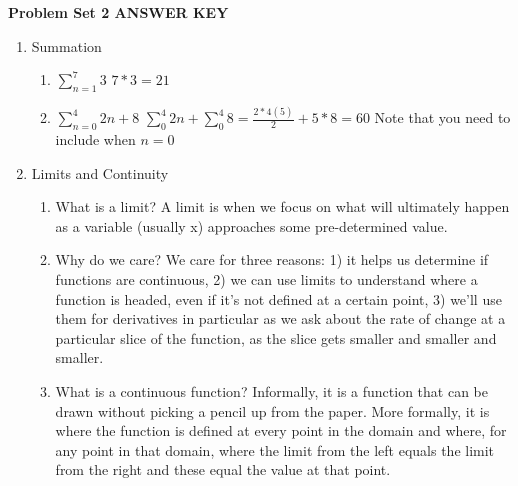 \documentclass[11pt]{article}
\begin{document}
\noindent \textbf{Problem Set 2 \color{gray} ANSWER KEY} \color{black}

\begin{enumerate}
\item Summation
\begin{enumerate}
\item $\sum_{n=1}^{7}3$ \color{gray} $7*3=21$\color{black}
\item $\sum_{n=0}^{4} 2n+8$ \color{gray} $\sum_0^4 2n+ \sum_0^4 8= \frac{2*4(5)}{2}+5*8=60$ Note that you need to include when $n=0$  \color{black}
\end{enumerate}

\item Limits and Continuity
\begin{enumerate}
\item What is a limit? \color{gray} A limit is when we focus on what will ultimately happen as a variable (usually x) approaches some pre-determined value. \color{black}
\item Why do we care? \color{gray} We care for three reasons: 1) it helps us determine if functions are continuous, 2) we can use limits to understand where a function is headed, even if it's not defined at a certain point, 3) we'll use them for derivatives in particular as we ask about the rate of change at a particular slice of the function, as the slice gets smaller and \small smaller and \tiny smaller. \normalsize \color{black}
\item What is a continuous function? \color{gray} Informally, it is a function that can be drawn without picking a pencil up from the paper. More formally, it is where the function is defined at every point in the domain and where, for any point in that domain, where the limit from the left equals the limit from the right and these equal the value at that point. \color{black}
\end{enumerate}


\end{enumerate}
\end{document}
